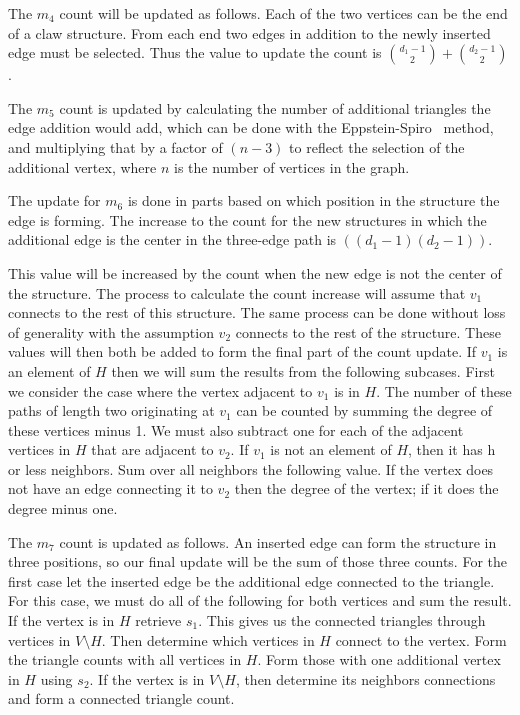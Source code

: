 \documentclass[11pt]{article}
\begin{document}
The $m_4$ count will be updated as follows.  Each of the two vertices can be the end of a claw structure.  From each end two edges in addition to the newly inserted edge must be selected.  Thus the value to update the count is $\binom{d_1-1}{2} + \binom{d_2-1}{2}$. 

The $m_5$ count is updated by calculating the number of additional triangles the edge addition would add, which can be done with the 
Eppstein-Spiro~\cite{es-hgadss-09}
method, and multiplying that by a factor of $(n-3)$ to reflect the selection of the additional vertex, where $n$ is the number of vertices in the graph.


The update for $m_6$ is done in parts based on which position in the structure the edge is forming.  The increase to the count for the new structures in which the additional edge is the center in the three-edge path is $((d_1 - 1)(d_2-1))$.  

This value will be increased by the count when the new edge is not the center of the structure.  The process to calculate the count increase will assume that $v_1$ connects to the rest of this structure.  The same process can be done without loss of generality with the assumption $v_2$ connects to the rest of the structure.  These values will then both be added to form the final part of the count update.  If $v_1$ is an element of $H$ then we will sum the results from the following subcases.  First we consider the case where the vertex adjacent to $v_1$ is in $H$.  The number of these paths of length two originating at $v_1$ can be counted by summing the degree of these vertices minus 1. We must also subtract one for each of the adjacent vertices in $H$ that are adjacent to $v_2$.  If $v_1$ is not an element of $H$, then it has h or less neighbors.  Sum over all neighbors the following value.  If the vertex does not have an edge connecting it to $v_2$ then the degree of the vertex; if it does the degree minus one.


The $m_7$ count is updated as follows.  An inserted edge can form the structure in three positions, so our final update will be the sum of those three counts.  For the first case let the inserted edge be the additional edge connected to the triangle.  For this case, we must do all of the following for both vertices and sum the result.  If the vertex is in $H$ retrieve $s_1$.  This gives us the connected triangles through vertices in $V \setminus H$.  Then determine which vertices in $H$ connect to the vertex.  Form the triangle counts with all vertices in $H$. Form those with one additional vertex in $H$ using $s_2$.  If the vertex is in $V \setminus H$, then determine its neighbors connections and form a connected triangle count.
\end{document}
